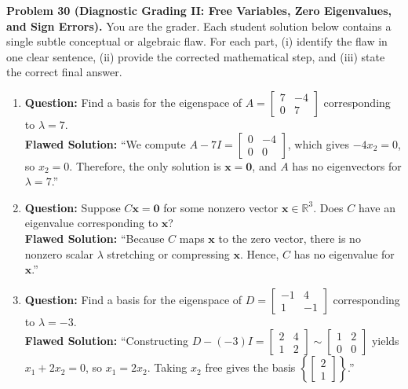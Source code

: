 \documentclass[11pt, letterpaper]{article}
\theoremstyle{definition}
\theoremstyle{remark}
\begin{document}
\textbf{Problem 30 (Diagnostic Grading II: Free Variables, Zero Eigenvalues, and Sign Errors).}
You are the grader. Each student solution below contains a single subtle conceptual or algebraic flaw. For each part, (i) identify the flaw in one clear sentence, (ii) provide the corrected mathematical step, and (iii) state the correct final answer.
\begin{enumerate}[label=(\alph*)]
    \item \textbf{Question:} Find a basis for the eigenspace of $A = \begin{bmatrix} 7 & -4 \\ 0 & 7 \end{bmatrix}$ corresponding to $\lambda = 7$.\\
    \textbf{Flawed Solution:} ``We compute $A - 7I = \begin{bmatrix} 0 & -4 \\ 0 & 0 \end{bmatrix}$, which gives $-4x_2 = 0$, so $x_2 = 0$. Therefore, the only solution is $\mathbf{x} = \mathbf{0}$, and $A$ has no eigenvectors for $\lambda = 7$.''
    \item \textbf{Question:} Suppose $C\mathbf{x} = \mathbf{0}$ for some nonzero vector $\mathbf{x} \in \mathbb{R}^3$. Does $C$ have an eigenvalue corresponding to $\mathbf{x}$?\\
    \textbf{Flawed Solution:} ``Because $C$ maps $\mathbf{x}$ to the zero vector, there is no nonzero scalar $\lambda$ stretching or compressing $\mathbf{x}$. Hence, $C$ has no eigenvalue for $\mathbf{x}$.''
    \item \textbf{Question:} Find a basis for the eigenspace of $D = \begin{bmatrix} -1 & 4 \\ 1 & -1 \end{bmatrix}$ corresponding to $\lambda = -3$.\\
    \textbf{Flawed Solution:} ``Constructing $D - (-3)I = \begin{bmatrix} 2 & 4 \\ 1 & 2 \end{bmatrix} \sim \begin{bmatrix} 1 & 2 \\ 0 & 0 \end{bmatrix}$ yields $x_1 + 2x_2 = 0$, so $x_1 = 2x_2$. Taking $x_2$ free gives the basis $\left\{ \begin{bmatrix} 2 \\ 1 \end{bmatrix} \right\}$.''
\end{enumerate}
\end{document}
